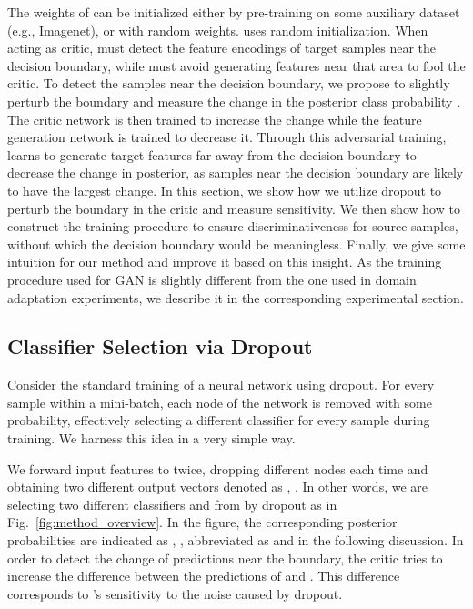 \documentclass{article} \usepackage{iclr2018_conference,times}
\begin{document}
The weights of  can be initialized either by pre-training on some auxiliary dataset (e.g., Imagenet), or with random weights.  uses random initialization. 
When acting as critic,  must detect the feature encodings of target samples near the decision boundary, while  must avoid generating features near that area to fool the critic. To detect the samples near the decision boundary, we propose to slightly perturb the boundary and measure the change in the posterior class probability . The critic network  is then trained to increase the change while the feature generation network  is trained to decrease it. Through this adversarial training,  learns to generate target features far away from the decision boundary to decrease the change in posterior, as samples near the decision boundary are likely to have the largest change. 
In this section, we show how we utilize dropout to perturb the boundary in the critic and measure sensitivity. We then show how to construct the training procedure to ensure discriminativeness for source samples, without which the decision boundary would be meaningless. Finally, we give some intuition for our method and improve it based on this insight.
As the training procedure used for GAN is slightly different from the one used in domain adaptation experiments, we describe it in the corresponding experimental section. 

\subsection{Classifier Selection via Dropout}
\vspace{-3mm}        


Consider the standard training of a neural network using dropout. For every sample within a mini-batch, each node of the network is removed with some probability, effectively selecting a different classifier for every sample during training. We harness this idea in a very simple way.

We forward input features  to  twice, dropping different nodes each time and obtaining two different output vectors denoted as , . In other words, we are selecting two different classifiers  and  from  by dropout as in Fig.~\ref{fig:method_overview}. In the figure, the corresponding posterior probabilities are indicated as , , abbreviated as  and  in the following discussion. In order to detect the change of predictions near the boundary, the critic tries to increase the difference between the predictions of  and . This difference corresponds to 's sensitivity to the noise caused by dropout. 
\end{document}

